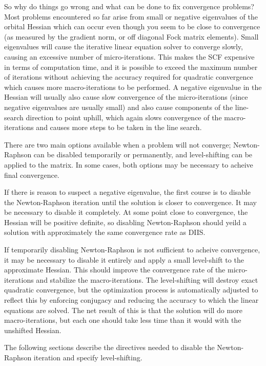 So why do things go wrong and what can be done to fix convergence
problems?  Most problems encountered so far arise from small or
negative eigenvalues of the orbital Hessian which can occur even
though you seem to be close to convergence (as measured by the
gradient norm, or off diagonal Fock matrix elements).  Small
eigenvalues will cause the iterative linear equation solver to
converge slowly, causing an excessive number of micro-iterations.
This makes the SCF expensive in terms of computation time, and it is
possible to exceed the maximum number of iterations without achieving
the accuracy required for quadratic convergence which causes more
macro-iterations to be performed.  A negative eigenvalue in the
Hessian will usually also cause slow convergence of the
micro-iterations (since negative eigenvalues are usually small) and
also cause components of the line-search direction to point uphill,
which again slows convergence of the macro-iterations and causes more
steps to be taken in the line search.

There are two main options available when a problem will not converge;
Newton-Raphson can be disabled temporarily or permanently, and
level-shifting can be applied to the matrix.  In some cases, both
options may be necessary to acheive final convergence.

If there is reason to suspect a negative eigenvalue, the first course
is to disable the Newton-Raphson iteration until the solution is
closer to convergence.  It may be necessary to disable it completely.
At some point close to convergence, the Hessian will be positive
definite, so disabling Newton-Raphson should yeild a solution with
approximately the same convergence rate as DIIS.

If temporarily disabling Newton-Raphson is not sufficient to acheive
convergence, it may be necessary to disable it entirely and apply a
small level-shift to the approximate Hessian.  This should improve the
convergence rate of the micro-iterations and stabilize the
macro-iterations.  The level-shifting will destroy exact quadratic
convergence, but the optimization process is automatically adjusted to
reflect this by enforcing conjugacy and reducing the accuracy to which
the linear equations are solved.  The net result of this is that the
solution will do more macro-iterations, but each one should take less
time than it would with the unshifted Hessian.

The following sections describe the directives needed to disable the
Newton-Raphson iteration and specify level-shifting.


